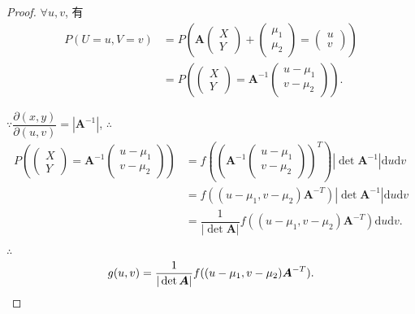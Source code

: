 \documentclass{ctexart}
\begin{document}
\begin{proof}
    $\forall u,v$, 有
    \begin{align*}
        P(U=u,V=v) & =P\left(\boldsymbol{A}\begin{pmatrix}
            X \\ Y
        \end{pmatrix}+\begin{pmatrix}
            \mu_1 \\ \mu_2
        \end{pmatrix}=\begin{pmatrix}
            u \\ v
        \end{pmatrix}\right) \\
        & =P\left(\begin{pmatrix}
            X \\ Y
        \end{pmatrix}=\boldsymbol{A}^{-1}\begin{pmatrix}
            u-\mu_1 \\ v-\mu_2
        \end{pmatrix}\right).
    \end{align*}

    $\because\dfrac{\partial(x,y)}{\partial(u,v)}=|\boldsymbol{A}^{-1}|$, $\therefore$ 
    \begin{align*}
        P\left(\begin{pmatrix}
            X \\ Y
        \end{pmatrix}=\boldsymbol{A}^{-1}\begin{pmatrix}
            u-\mu_1 \\ v-\mu_2
        \end{pmatrix}\right) & =f\left(\left(\boldsymbol{A}^{-1}\begin{pmatrix}
            u-\mu_1 \\ v-\mu_2
        \end{pmatrix}\right)^T\right)|\det\boldsymbol{A}^{-1}|\mathrm{d}u\mathrm{d}v \\
        & =f((u-\mu_1,v-\mu_2)\boldsymbol{A}^{-T})|\det\boldsymbol{A}^{-1}|\mathrm{d}u\mathrm{d}v \\
        & =\dfrac{1}{|\det\boldsymbol{A}|}f((u-\mu_1,v-\mu_2)\boldsymbol{A}^{-T})\mathrm{d}u\mathrm{d}v.
    \end{align*}

    $\therefore$
    \[g(u,v)=\dfrac{1}{|\det\boldsymbol{A}|}f((u-\mu_1,v-\mu_2)\boldsymbol{A}^{-T}).\qedhere\]
\end{proof}
\end{document}
